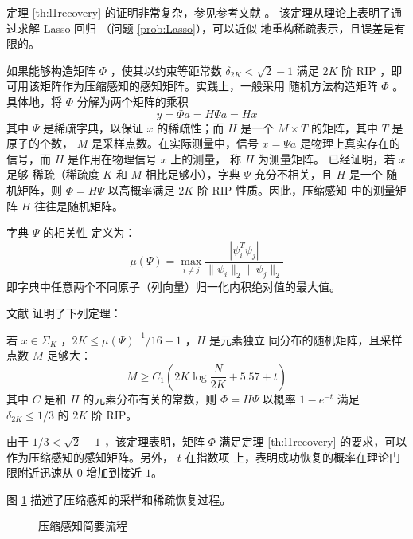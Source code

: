 定理 \ref{th:l1recovery} 的证明非常复杂，参见参考文献 \cite{RIPimplieCS}。
该定理从理论上表明了通过求解 Lasso 回归 （问题 \ref{prob:Lasso}），可以近似
地重构稀疏表示，且误差是有限的。

如果能够构造矩阵 $\Phi$ ，使其以约束等距常数 $\delta_{2K} < \sqrt{2}-1$
满足 $2K$ 阶 RIP ，即可用该矩阵作为压缩感知的感知矩阵。实践上，一般采用
随机方法构造矩阵 $\Phi$ 。具体地，将 $\Phi$ 分解为两个矩阵的乘积
\begin{equation}
y = \Phi a = H \Psi a = H x
\end{equation}
其中 $\Psi$ 是稀疏字典，以保证 $x$ 的稀疏性；而 $H$ 是一个 $M \times T$
的矩阵，其中 $T$ 是原子的个数， $M$ 是采样点数。在实际测量中，信号
$x = \Psi a$ 是物理上真实存在的信号，而 $H$ 是作用在物理信号 $x$ 上的测量，
称 $H$ 为测量矩阵。 已经证明，若 $x$ 足够
稀疏（稀疏度 $K$ 和 $M$ 相比足够小），字典 $\Psi$ 充分不相关，且 $H$ 是一个
随机矩阵，则 $\Phi = H \Psi$ 以高概率满足 $2K$ 阶 RIP 性质。因此，压缩感知
中的测量矩阵 $H$ 往往是随机矩阵。
\begin{definition}[相关性]
字典 $\Psi$ 的相关性 定义为：
\begin{equation}
\mu(\Psi) = \max_{i \neq j} \frac{|\psi_i^T \psi_j|}{\|\psi_i\|_2
\|\psi_j\|_2}
\end{equation}
即字典中任意两个不同原子（列向量）归一化内积绝对值的最大值。
\end{definition}

文献 \cite{CSRedundant} 证明了下列定理：
\begin{theorem} \label{th:RandomRIP}
若 $x \in \Sigma_K$ ，$2K \leq \mu(\Psi)^{-1}/16+1$ ，$H$ 是元素独立
同分布的随机矩阵，且采样点数 $M$ 足够大：
\begin{equation}
M \geq C_1(2K \log \frac{N}{2K} + 5.57 + t)
\end{equation}
其中 $C$ 是和 $H$ 的元素分布有关的常数，则 $\Phi = H \Psi$ 以概率
$1 - e^{-t}$ 满足 $\delta_{2K} \leq 1/3$ 的 $2K$ 阶 RIP。
\end{theorem}

由于 $1/3 < \sqrt{2} - 1$ ，该定理表明，矩阵 $\Phi$ 满足定理
\ref{th:l1recovery} 的要求，可以作为压缩感知的感知矩阵。另外， $t$ 在指数项
上，表明成功恢复的概率在理论门限附近迅速从 $0$ 增加到接近 $1$。

图 \ref{fig:CS} 描述了压缩感知的采样和稀疏恢复过程。

\begin{figure}
\centering
{} %
\caption{压缩感知简要流程}
\label{fig:CS}
\end{figure}

